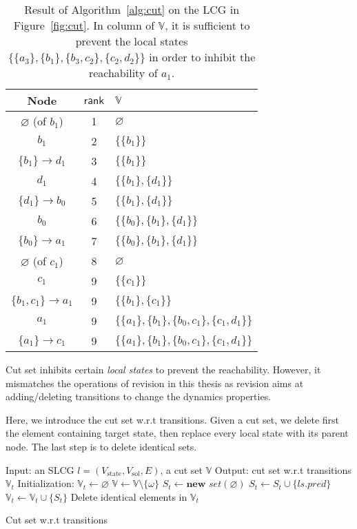 \begin{table}[ht]
\centering
\begin{tabular}{|c|c|l|}
 \hline 
 Node & $\mathsf{rank}$ & $\mathbb{V}$ \\ 
 \hline 
 $\varnothing$ (of $b_1$) & 1 & $\varnothing$ \\ 
 \hline 
 $b_1$ & 2 & $\{\{b_1\}\}$ \\ 
 \hline 
 $\{b_1\}\to d_1$ & 3 & $\{\{b_1\}\}$ \\ 
 \hline 
 $d_1$ & 4 & $\{\{b_1\},\{d_1\}\}$ \\ 
 \hline 
 $\{d_1\}\to b_0$ & 5 & $\{\{b_1\},\{d_1\}\}$ \\ 
 \hline 
 $b_0$ & 6 & $\{\{b_0\},\{b_1\},\{d_1\}\}$ \\ 
 \hline 
 $\{b_0\}\to a_1$ & 7 & $\{\{b_0\},\{b_1\},\{d_1\}\}$ \\ 
 \hline 
 $\varnothing$ (of $c_1$) & 8 & $\varnothing$ \\ 
 \hline 
 $c_1$ & 9 & $\{\{c_1\}\}$ \\ 
 \hline 
 $\{b_1,c_1\}\to a_1$ & 9 & $\{\{b_1\},\{c_1\}\}$ \\ 
 \hline 
 $a_1$ & 9 & $\{\{a_1\},\{b_1\},\{b_0,c_1\},\{c_1,d_1\}\}$ \\ 
 \hline 
 $\{a_1\}\to c_1$ & 9 & $\{\{a_1\},\{b_1\},\{b_0,c_1\},\{c_1,d_1\}\}$ \\ 
 \hline 
 \end{tabular}
 \caption[Example of cut set]{Result of Algorithm~\ref{alg:cut} on the LCG in Figure~\ref{fig:cut}.
 In column of $\mathbb{V}$, it is sufficient to prevent the local states $\{\{a_3\},\{b_1\},\{b_3,c_2\},\{c_2,d_2\}\}$ in order to inhibit the reachability of $a_1$.}\label{tab:cutset}
\end{table}

Cut set inhibits certain \textit{local states} to prevent the reachability.
However, it mismatches the operations of revision in this thesis as revision aims at adding/deleting transitions to change the dynamics properties.

Here, we introduce the cut set w.r.t transitions.
Given a cut set, we delete first the element containing target state, then replace every local state with its parent node.
The last step is to delete identical sets.

\begin{algorithm}[ht]
\begin{algorithmic}
\State Input: an SLCG $l= (V_{\mathrm{state}},V_{\mathrm{sol}},E)$, a cut set $\mathbb{V}$
\State Output: cut set w.r.t transitions $\mathbb{V}_t$
\State Initialization: $\mathbb{V}_t\gets \varnothing$
        \State $\mathbb{V}\gets \mathbb{V}\setminus \{\omega\}$
    \EndIf
    \State $S_t\gets \textbf{new } set(\varnothing)$
        \State $S_t\gets S_t\cup \{ls.pred\}$
    \EndFor
    \State $\mathbb{V}_t\gets \mathbb{V}_t\cup \{S_t\}$
\EndFor
\State Delete identical elements in $\mathbb{V}_t$
\State {}
\end{algorithmic}
\caption{Cut set w.r.t transitions}\label{alg:cutsetTr}
\end{algorithm}

